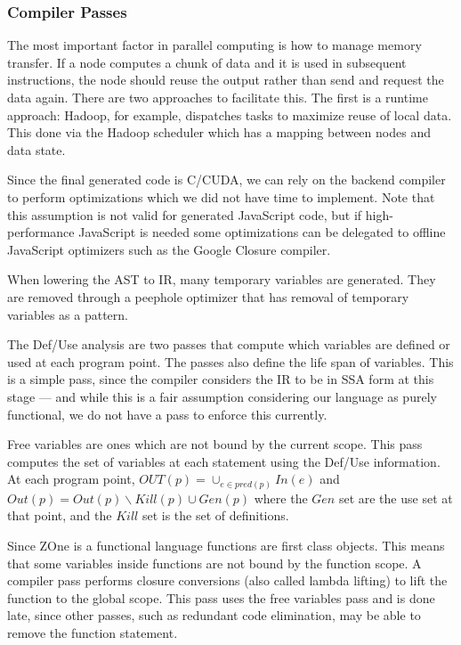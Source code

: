 \subsubsection{Compiler Passes}

The most important factor in parallel computing is how to manage memory
transfer. If a node computes a chunk of data and it is used in
subsequent instructions, the node should reuse the output rather than
send and request the data again. There are two approaches to facilitate
this. The first is a runtime approach: Hadoop, for example, dispatches
tasks to maximize reuse of local data. This done via the Hadoop
scheduler which has a mapping between nodes and data state.

Since the final generated code is C/CUDA, we can rely on the backend compiler
	to perform optimizations which we did not have time
	to implement.
Note that this assumption is not valid for generated
	JavaScript code, but if high-performance JavaScript is needed
        some optimizations
	can be delegated to offline JavaScript optimizers such as the
	Google Closure\cite{bolin2010closure} compiler.


When lowering the AST to IR, many temporary variables are generated.
They are removed through a peephole optimizer that has removal of
	temporary variables as a pattern.


The Def/Use analysis are two passes that compute which variables are defined
	or used at each program point.
The passes also define the life span of variables.
This is a simple pass, since the compiler considers the IR to be in SSA form
 	at this stage --- and while this is a fair assumption considering our
	language as purely functional, we do not have a pass to enforce this currently.


Free variables are ones which are not bound by the current scope.
This pass computes the set of variables at each statement using
	the Def/Use information.
At each program point, $OUT(p) = \cup_{e \in pred(p)} In(e)$ and $Out(p) = Out(p) \backslash Kill(p) \cup Gen(p)$
	where the $Gen$ set are the use set at that point, and the $Kill$ set is the set
 of definitions.


Since ZOne is a functional language functions are
	first class objects.
This means that some variables inside functions are not
	bound by the function scope.
A compiler pass performs closure conversions (also called
	lambda lifting) to lift the function to the global scope.
This pass uses the free variables pass and is done late,
	since other passes, such as
	redundant code elimination, may be able to remove the
	function statement.

